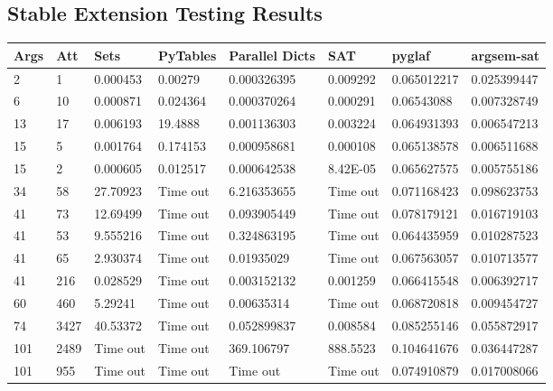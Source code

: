 %
\begin{landscape}
	
\section{Stable Extension Testing Results}

\label{appendix:stableResults}
\begin{longtabu} {|l|l|l|l|l|l|l|l|}
\toprule
Args & Att & Sets     & PyTables & Parallel Dicts & SAT      & pyglaf      & argsem-sat  \\ \midrule
\endhead

2         & 1       & 0.000453 & 0.00279  & 0.000326395    & 0.009292 & 0.065012217 & 0.025399447 \\
6         & 10      & 0.000871 & 0.024364 & 0.000370264    & 0.000291 & 0.06543088  & 0.007328749 \\
13        & 17      & 0.006193 & 19.4888  & 0.001136303    & 0.003224 & 0.064931393 & 0.006547213 \\
15        & 5       & 0.001764 & 0.174153 & 0.000958681    & 0.000108 & 0.065138578 & 0.006511688 \\
15        & 2       & 0.000605 & 0.012517 & 0.000642538    & 8.42E-05 & 0.065627575 & 0.005755186 \\
34        & 58      & 27.70923 & Time out & 6.216353655    & Time out & 0.071168423 & 0.098623753 \\
41        & 73      & 12.69499 & Time out & 0.093905449    & Time out & 0.078179121 & 0.016719103 \\
41        & 53      & 9.555216 & Time out & 0.324863195    & Time out & 0.064435959 & 0.010287523 \\
41        & 65      & 2.930374 & Time out & 0.01935029     & Time out & 0.067563057 & 0.010713577 \\
41        & 216     & 0.028529 & Time out & 0.003152132    & 0.001259 & 0.066415548 & 0.006392717 \\
60        & 460     & 5.29241  & Time out & 0.00635314     & Time out & 0.068720818 & 0.009454727 \\
74        & 3427    & 40.53372 & Time out & 0.052899837    & 0.008584 & 0.085255146 & 0.055872917 \\
101       & 2489    & Time out & Time out & 369.106797     & 888.5523 & 0.104641676 & 0.036447287 \\
101       & 955     & Time out & Time out & Time out       & Time out & 0.074910879 & 0.017008066 \\

\end{longtabu}
\end{landscape}
